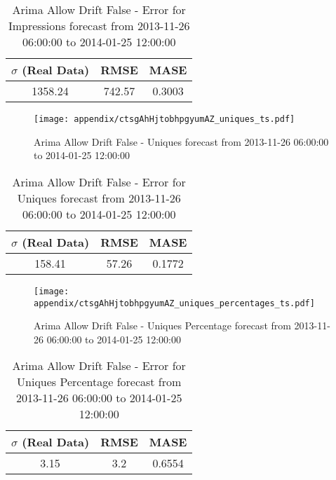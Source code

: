 \begin{table}[H]
\centering
\footnotesize
\begin{tabular}{ccc}
$\sigma$ (Real Data) & RMSE & MASE   \\ \hline
1358.24 & 742.57 & 0.3003 \\
\end{tabular}

\vspace{0.5cm}

\caption{
Arima Allow Drift False - Error for Impressions forecast from 2013-11-26 06:00:00 to 2014-01-25 12:00:00}
\end{table}

\begin{figure}[H] \begin{center} \leavevmode
\texttt{[image: appendix/ctsgAhHjtobhpgyumAZ\_uniques\_ts.pdf]} \caption{
Arima Allow Drift False - Uniques forecast from 2013-11-26 06:00:00 to 2014-01-25 12:00:00} \label{fig:appendix/ctsgAhHjtobhpgyumAZ_uniques_ts.pdf} \end{center}
\end{figure}

\begin{table}[H]
\centering
\footnotesize
\begin{tabular}{ccc}
$\sigma$ (Real Data) & RMSE & MASE   \\ \hline
158.41 & 57.26 & 0.1772 \\
\end{tabular}

\vspace{0.5cm}

\caption{
Arima Allow Drift False - Error for Uniques forecast from 2013-11-26 06:00:00 to 2014-01-25 12:00:00}
\end{table}

\begin{figure}[H] \begin{center} \leavevmode
\texttt{[image: appendix/ctsgAhHjtobhpgyumAZ\_uniques\_percentages\_ts.pdf]} \caption{
Arima Allow Drift False - Uniques Percentage forecast from 2013-11-26 06:00:00 to 2014-01-25 12:00:00} \label{fig:appendix/ctsgAhHjtobhpgyumAZ_uniques_percentages_ts.pdf} \end{center}
\end{figure}

\begin{table}[H]
\centering
\footnotesize
\begin{tabular}{ccc}
$\sigma$ (Real Data) & RMSE & MASE   \\ \hline
3.15 & 3.2 & 0.6554 \\
\end{tabular}

\vspace{0.5cm}

\caption{
Arima Allow Drift False - Error for Uniques Percentage forecast from 2013-11-26 06:00:00 to 2014-01-25 12:00:00}
\end{table}

